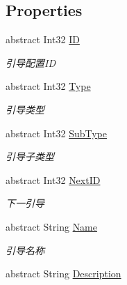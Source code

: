 \subsection*{Properties}
\begin{DoxyCompactItemize}
\item 
abstract Int32 \mbox{\hyperlink{class_t_net_1_1_com_1_1_model_1_1_guide_data_a03c2523ab5bebed7432ce36c411f2e74}{ID}}
\begin{DoxyCompactList}\small\item\em 引导配置\+ID \end{DoxyCompactList}\item 
abstract Int32 \mbox{\hyperlink{class_t_net_1_1_com_1_1_model_1_1_guide_data_a29b0fda4b4a6270743e6b6e401477244}{Type}}
\begin{DoxyCompactList}\small\item\em 引导类型 \end{DoxyCompactList}\item 
abstract Int32 \mbox{\hyperlink{class_t_net_1_1_com_1_1_model_1_1_guide_data_a85e216e385785d80e08086f37c2138fc}{Sub\+Type}}
\begin{DoxyCompactList}\small\item\em 引导子类型 \end{DoxyCompactList}\item 
abstract Int32 \mbox{\hyperlink{class_t_net_1_1_com_1_1_model_1_1_guide_data_a486aed69ba81f35dc00f3f5ceabeb02a}{Next\+ID}}
\begin{DoxyCompactList}\small\item\em 下一引导 \end{DoxyCompactList}\item 
abstract String \mbox{\hyperlink{class_t_net_1_1_com_1_1_model_1_1_guide_data_a561aad5256bd55adca917e94da757704}{Name}}
\begin{DoxyCompactList}\small\item\em 引导名称 \end{DoxyCompactList}\item 
abstract String \mbox{\hyperlink{class_t_net_1_1_com_1_1_model_1_1_guide_data_ae641a0e1f3fa1d8114840847e98b2f2c}{Description}}

\end{DoxyCompactItemize}
